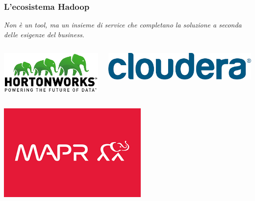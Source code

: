 \documentclass[10pt,xcolor=dvipsnames,flushleft]{beamer}
\begin{document}
\begin{frame}[t]
\frametitle{L'ecosistema Hadoop}

\begin{block}{}
	\begin{center}
		\textit{Non è un tool, ma un insieme di service che completano la soluzione a seconda delle esigenze del business.}
	\end{center}
\end{block}


\begin{columns}
	\begin{column}{0.5\textwidth}
		\includegraphics[scale=0.4]{img/hws_logo}
	\end{column}
	\begin{column}{0.5\textwidth}
		\includegraphics[scale=0.2]{img/cloudera_logo}
	\end{column}
\end{columns}
\begin{center}
	\includegraphics[scale=0.2]{img/mapR_logo}
\end{center}

\end{frame}
\end{document}

